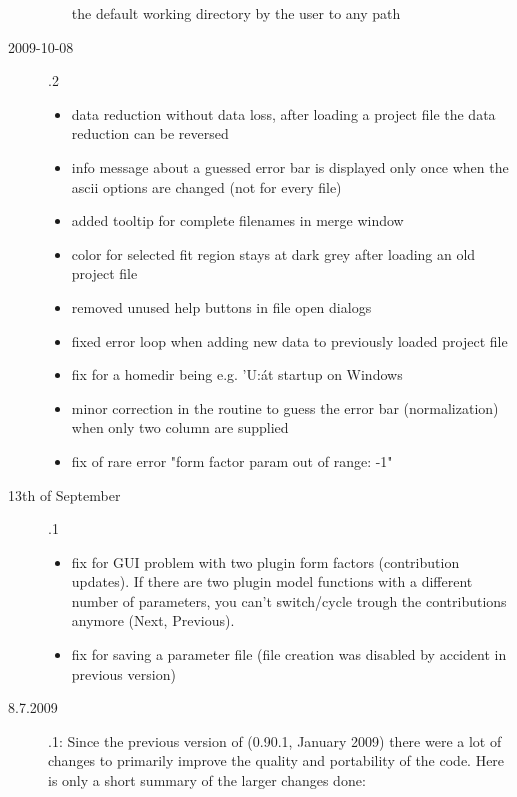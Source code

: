 \begin{description}
\begin{itemize}
              the default working directory by the user to any path
        \end{itemize}
    \item[2009-10-08] .2
        \begin{itemize}
          \item data reduction without data loss, after loading a project file the data reduction can be reversed
          \item info message about a guessed error bar is displayed only once when the ascii options are changed
                (not for every file)
          \item added tooltip for complete filenames in merge window
          \item color for selected fit region stays at dark grey after loading an old project file
          \item removed unused help buttons in file open dialogs
          \item fixed error loop when adding new data to previously loaded project file
          \item fix for a homedir being e.g. 'U:\' at startup on Windows
          \item minor correction in the routine to guess the error bar (normalization) when only two column are supplied
          \item fix of rare error "form factor param out of range: -1"
        \end{itemize}
    \item[13th of September] .1
        \begin{itemize}
          \item fix for GUI problem with two plugin form factors (contribution updates).
                If there are two plugin model functions with a different number of parameters,
                you can't switch/cycle trough the contributions anymore (Next, Previous).
          \item fix for saving a parameter file (file creation was disabled by accident in previous version)
        \end{itemize}
        \item[8.7.2009] .1: Since the previous version of
                    \SASfit (0.90.1, January 2009) there were a lot of changes to
                    primarily improve the quality and portability of the code. Here is
                    only a short summary of the larger changes done:
        \begin{itemize}

\end{itemize}
\end{description}
